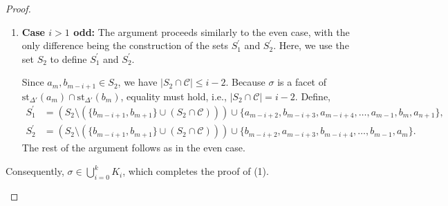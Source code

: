 \documentclass[11pt,reqno,a4paper]{amsart}
\theoremstyle{definition}
\theoremstyle{theorem}
\newcommand{\lno}{\left(}
\newcommand{\rno}{\right)}
\newcommand{\lcu}{\left\{}
\newcommand{\rcu}{\right\}}
\newcommand{\st}{\mathrm{st}}
\theoremstyle{remark}
\begin{document}
\begin{proof}
\begin{enumerate}
\begin{enumerate}
        Our goal is to construct $S_1'$ and $S_2'$ in $(\sigma \cup \{a_m\})^c$ and $(\sigma \cup \{b_m\})^c$, respectively, 
        such that $b_{m-i+1} \notin S_1', S_2'$. 
        This will imply that $\sigma \cup \{b_{m-i+1}\} \in \st_{\Delta'}\lno a_m \rno \cap \st_{\Delta'}\lno b_m \rno$.

        We may further assume that $b_{m-i+1}$ belongs to both $S_1$ and $S_2$, as the same sets otherwise suffice. 
        Let $\mathcal{C} = \bigsqcup\limits_{j=1}^{i-1} C_j$, where $C_j = \lcu a_{m-j+1}, b_{m-j+1} \rcu$. 
        Since $b_m, b_{m-i+1} \in S_1$, with $i > 2$, we have $|S_1 \cap \mathcal{C}| \le i-2$. 
        Moreover, because $\sigma$ is a facet in $\st_{\Delta'}\lno a_m \rno \cap \st_{\Delta'}\lno b_m \rno$, equality holds, i.e., $|S_1 \cap \mathcal{C}| = i-2$. 

        Define $S_1'$ and $S_2'$ as follows:
        \begin{align*}
            S_1' &= \lno S_1 \setminus (\{b_{m-i+1}\} \cup (S_1         \cap \mathcal{C})) \rno 
                \cup \{b_{m-i+2}, a_{m-i+3}, b_{m-i+4}, \dots, a_{m-1}, b_m\},\\[4pt]
            S_2' &= \lno S_1 \setminus (\{b_{m-i+1}, a_{m+1}\}          \cup (S_1 \cap \mathcal{C})) \rno 
                \cup \{a_{m-i+2}, b_{m-i+3}, a_{m-i+4}, \dots, b_{m-1}, a_m, b_{m+1}\}.
        \end{align*}
        Then $S_1'$ and $S_2'$ are $k$-independent sets in $(\sigma \cup \{a_m\})^c$ and $(\sigma \cup \{b_m\})^c$, respectively, 
        completing the argument for the case when $i$ is even.
        
        \item \textbf{Case $i>1$ odd:}
            The argument proceeds similarly to the even case, with the only difference being the construction of the sets ${S}_1^\prime$ and ${S}_2^\prime$. Here, we use the set $S_2$ to define ${S}_1^\prime$ and ${S}_2^\prime$. 
    
            Since $a_m, b_{m-i+1}\in S_2$, we have $|S_2 \cap \mathcal{C}|\leq i-2$. Because $\sigma$ is a facet of $\st_{\Delta'}\lno a_m \rno \cap \st_{\Delta'}\lno b_m \rno$, equality must hold, i.e., $|S_2 \cap \mathcal{C}|= i-2$.  Define,
            \begin{align*}
               {S}_1^\prime & = \lno S_2\setminus (\{b_{m-i+1},b_{m+1}\} \cup (S_2\cap \mathcal{C})) \rno  \cup \{a_{m-i+2},b_{m-i+3},a_{m-i+4},\dots,a_{m-1},b_m,a_{n+1}\},\\
                {S}_2^\prime & = \lno S_2\setminus (\{b_{m-i+1},b_{m+1}\} \cup (S_2\cap \mathcal{C})) \rno  \cup \{b_{m-i+2},a_{m-i+3},b_{m-i+4},\dots,b_{m-1},a_m\}.
            \end{align*}
            The rest of the argument follows as in the even case.
    \end{enumerate}
        Consequently, $\sigma \in \bigcup\limits_{i=0}^k K_i$, which completes the proof of (1).




\end{enumerate}
\end{proof}
\end{document}
